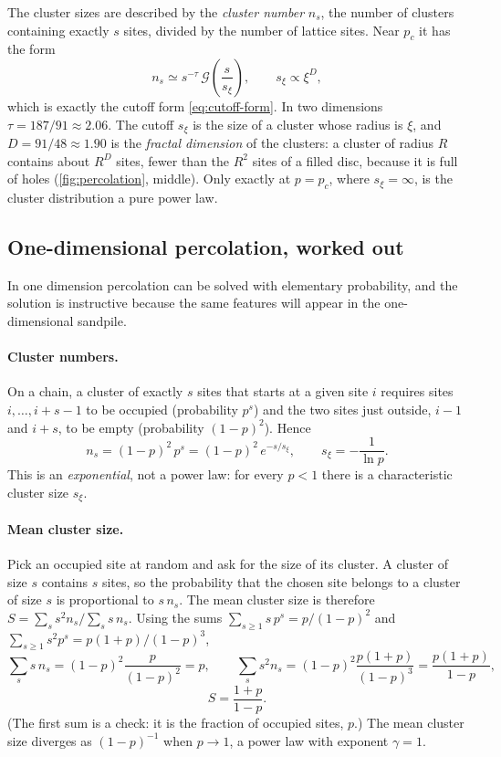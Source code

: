 The cluster sizes are described by the \emph{cluster number} $n_s$, the number of clusters containing exactly
$s$ sites, divided by the number of lattice sites. Near $p_c$ it has the form
\begin{equation}
  n_s \simeq s^{-\tau}\,\mathcal G\!\left(\frac{s}{s_\xi}\right),\qquad s_\xi \propto \xi^{D},
  \label{eq:perc-scaling}
\end{equation}
which is exactly the cutoff form \cref{eq:cutoff-form}. In two dimensions $\tau = 187/91\approx2.06$. The
cutoff $s_\xi$ is the size of a cluster whose radius is $\xi$, and $D=91/48\approx1.90$ is the \emph{fractal
dimension} of the clusters: a cluster of radius $R$ contains about $R^{D}$ sites, fewer than the $R^2$ sites of
a filled disc, because it is full of holes (\cref{fig:percolation}, middle). Only exactly at $p=p_c$, where
$s_\xi=\infty$, is the cluster distribution a pure power law.

\subsection{One-dimensional percolation, worked out}
\label{sec:perc1d}

In one dimension percolation can be solved with elementary probability, and the solution is instructive
because the same features will appear in the one-dimensional sandpile.

\paragraph{Cluster numbers.} On a chain, a cluster of exactly $s$ sites that starts at a given site $i$ requires
sites $i,\dots,i+s-1$ to be occupied (probability $p^s$) and the two sites just outside, $i-1$ and $i+s$, to be
empty (probability $(1-p)^2$). Hence
\begin{equation}
  n_s = (1-p)^2\, p^{s} = (1-p)^2\, e^{-s/s_\xi},\qquad s_\xi = -\frac{1}{\ln p} .
\end{equation}
This is an \emph{exponential}, not a power law: for every $p<1$ there is a characteristic cluster size $s_\xi$.

\paragraph{Mean cluster size.} Pick an occupied site at random and ask for the size of its cluster. A cluster of
size $s$ contains $s$ sites, so the probability that the chosen site belongs to a cluster of size $s$ is
proportional to $s\,n_s$. The mean cluster size is therefore $S = \sum_s s^2 n_s / \sum_s s\,n_s$. Using the sums
$\sum_{s\ge1} s\,p^s = p/(1-p)^2$ and $\sum_{s\ge1}s^2p^s = p(1+p)/(1-p)^3$,
\begin{equation}
  \sum_s s\, n_s = (1-p)^2\frac{p}{(1-p)^2} = p, \qquad
  \sum_s s^2 n_s = (1-p)^2\frac{p(1+p)}{(1-p)^3} = \frac{p(1+p)}{1-p},
\end{equation}
\begin{equation}
  S = \frac{1+p}{1-p} .
\end{equation}
(The first sum is a check: it is the fraction of occupied sites, $p$.) The mean cluster size diverges as
$(1-p)^{-1}$ when $p\to1$, a power law with exponent $\gamma=1$.

